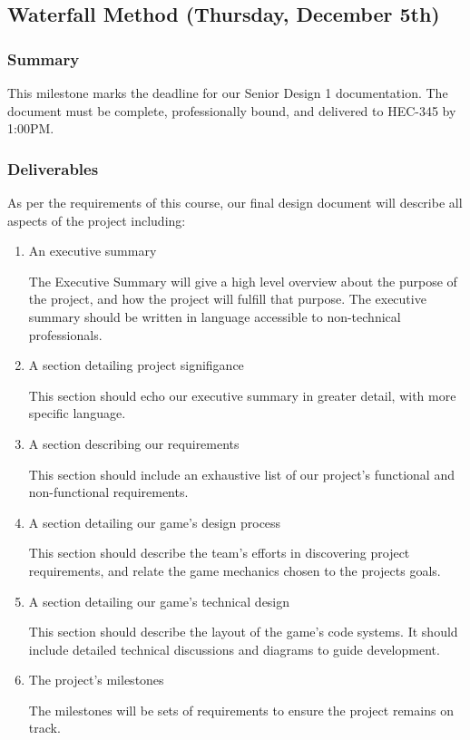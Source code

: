 \subsection{Waterfall Method (Thursday, December 5th)}

\subsubsection*{Summary}
This milestone marks the deadline for our Senior Design 1 documentation. The document must be complete, professionally bound, and delivered to HEC-345 by 1:00PM.

\subsubsection*{Deliverables}
As per the requirements of this course, our final design document will describe
all aspects of the project including:
\begin{enumerate}
  \item An executive summary
  
  The Executive Summary will give a high level overview about the purpose of the project, and how the project will fulfill that purpose. The executive summary should be written in language accessible to non-technical professionals.

  \item A section detailing project signifigance
  
  This section should echo our executive summary in greater detail, with more specific language.

  \item A section describing our requirements
  
  This section should include an exhaustive list of our project's functional and non-functional requirements.

  \item A section detailing our game's design process
  
  This section should describe the team's efforts in discovering project requirements, and relate the game mechanics chosen to the projects goals.

  \item A section detailing our game's technical design
  
  This section should describe the layout of the game's code systems. It should include detailed technical discussions and diagrams to guide development.

  \item The project's milestones
  
  The milestones will be sets of requirements to ensure the project remains on track.

\end{enumerate}


